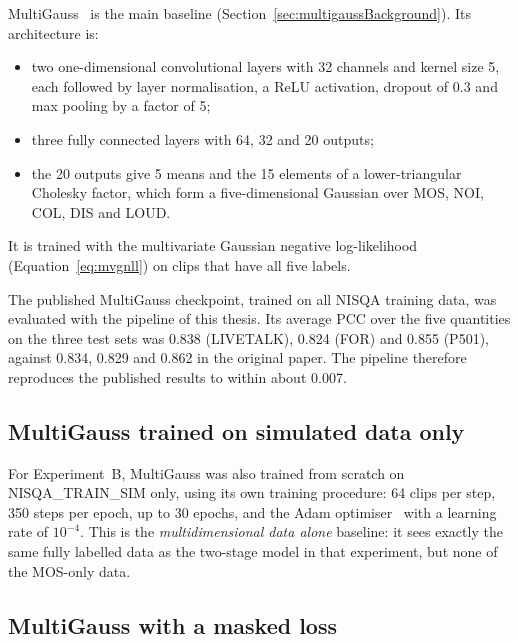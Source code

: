 \documentclass[
english,                 %
bibtex,                  %
includeExtraAbstracts, %
]{kththesis}
\numberwithin{listing}{chapter}
\begin{document}
MultiGauss~\cite{cumlin_multigauss_2025} is the main baseline (Section~\ref{sec:multigaussBackground}). Its architecture is:
\begin{itemize}
\item two one-dimensional convolutional layers with 32 channels and kernel size 5, each followed by layer normalisation, a \gls{ReLU} activation, dropout of 0.3 and max pooling by a factor of 5;
\item three fully connected layers with 64, 32 and 20 outputs;
\item the 20 outputs give 5 means and the 15 elements of a lower-triangular Cholesky factor, which form a five-dimensional Gaussian over MOS, NOI, COL, DIS and LOUD.
\end{itemize}
It is trained with the multivariate Gaussian negative log-likelihood (Equation~\eqref{eq:mvgnll}) on clips that have all five labels.

The published MultiGauss checkpoint, trained on all NISQA training data, was evaluated with the pipeline of this thesis. Its average PCC over the five quantities on the three test sets was 0.838 (LIVETALK), 0.824 (FOR) and 0.855 (P501), against 0.834, 0.829 and 0.862 in the original paper. The pipeline therefore reproduces the published results to within about 0.007.

\subsection{MultiGauss trained on simulated data only}

For Experiment~B, MultiGauss was also trained from scratch on NISQA\_TRAIN\_SIM only, using its own training procedure: 64 clips per step, 350 steps per epoch, up to 30 epochs, and the Adam optimiser~\cite{kingma_adam_2015} with a learning rate of $10^{-4}$. This is the \emph{multidimensional data alone} baseline: it sees exactly the same fully labelled data as the two-stage model in that experiment, but none of the MOS-only data.

\subsection{MultiGauss with a masked loss}
\label{sec:nanBaseline}
\end{document}
